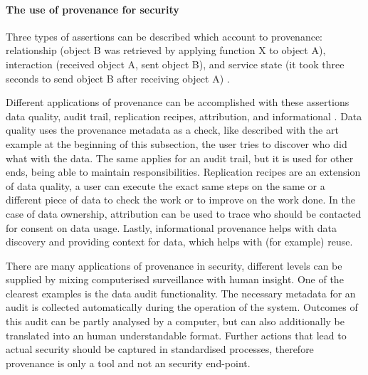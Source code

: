 \paragraph{The use of provenance for security}
\label{provenance-use}

Three types of assertions can be described which account to provenance: relationship (object B was retrieved by applying function X to object A), interaction (received object A, sent object B), and service state (it took three seconds to send object B after receiving object A) \cite{dsp4moreau}.

Different applications of provenance can be accomplished with these assertions \eg{} data quality, audit trail, replication recipes, attribution, and informational \cite{dsp1simmhan}.
Data quality uses the provenance metadata as a check, like described with the art example at the beginning of this subsection, the user tries to discover who did what with the data.
The same applies for an audit trail, but it is used for other ends, being able to maintain responsibilities.
Replication recipes are an extension of data quality, a user can execute the exact same steps on the same or a different piece of data to check the work or to improve on the work done.
In the case of data ownership, attribution can be used to trace who should be contacted for consent on data usage.
Lastly, informational provenance helps with data discovery and providing context for data, which helps with (for example) reuse.

 There are many applications of provenance in security, different levels can be supplied by mixing computerised surveillance with human insight.
One of the clearest examples is the data audit functionality.
The necessary metadata for an audit is collected automatically during the operation of the system.
Outcomes of this audit can be partly analysed by a computer, but can also additionally be translated into an human understandable format.
Further actions that lead to actual security should be captured in standardised processes, therefore provenance is only a tool and not an security end-point.

